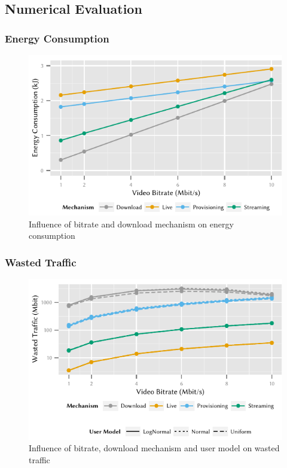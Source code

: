 \subsection{Numerical Evaluation}\label{sec:application:lte_video:numerical_evaluation}

\subsubsection*{Energy Consumption}\label{sec:application:lte_video:numerical_evaluation:energy_consumption}

\begin{figure}
  \centering
  \includegraphics{application/lte_video/numerical_evaluation/figures/bitrate2energy}
  \caption{Influence of bitrate and download mechanism on energy consumption}
  \label{fig:application:lte_video:numerical_evaluation:energy_consumption:bitrate2energy}
\end{figure}

\subsubsection*{Wasted Traffic}\label{sec:application:lte_video:numerical_evaluation:wasted_traffic}

\begin{figure}
  \centering
  \includegraphics{application/lte_video/numerical_evaluation/figures/bitrate2lostData}
  \caption{Influence of bitrate, download mechanism and user model on wasted traffic}
  \label{fig:application:lte_video:numerical_evaluation:energy_consumption:bitrate2lostData}
\end{figure}

